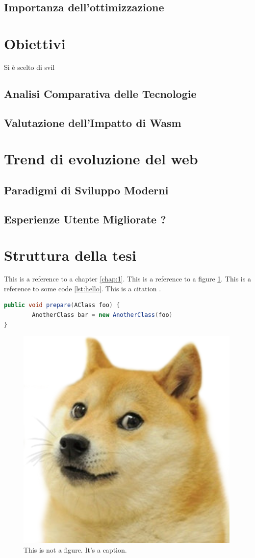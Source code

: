\subsection{Importanza dell'ottimizzazione}

\section{Obiettivi}
\label{sec:Obiettivi}
Si è scelto di svil

\subsection{Analisi Comparativa delle Tecnologie}

\subsection{Valutazione dell'Impatto di Wasm}




\section{Trend di evoluzione del web}
\label{sec:Trend}
\subsection{Paradigmi di Sviluppo Moderni}

\subsection{Esperienze Utente Migliorate ?}



\section{Struttura della tesi}
\label{sec:struttura}

This is a reference to a chapter \ref{chap:1}. This is a reference to a figure \ref{fig:doge}. This is a reference to some code \ref{lst:hello}. This is a citation \cite{famous:paper}.



\begin{lstlisting}[language=Java, label=lst:java, caption={Some code in another language than the default one}]
public void prepare(AClass foo) {
        AnotherClass bar = new AnotherClass(foo)
}
\end{lstlisting}


\begin{figure}
\begin{center}
\includegraphics[width=0.3\columnwidth]{images/doge.png}
\end{center}
\caption{This is not a figure. It's a caption.}
\label{fig:doge}
\end{figure}
